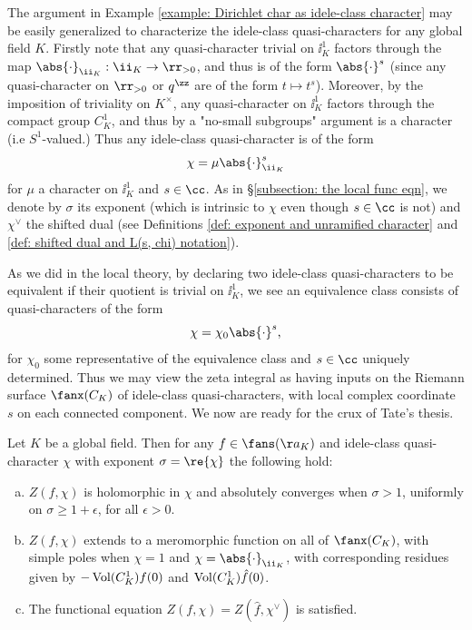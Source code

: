 \documentclass[11pt, x11names, openany]{book}
\begin{document}
The argument in Example \ref{example: Dirichlet char as idele-class character} may be easily generalized to characterize the idele-class quasi-characters for any global field $K$. Firstly note that any quasi-character trivial on $\ii^1_K$ factors through the map $\abs{\cdot}_{\ii_K}: \ii_K \to \rr_{> 0}$, and thus is of the form $\abs{\cdot}^s$ (since any quasi-character on $\rr_{> 0}$ or $q^\zz$ are of the form $t \mapsto t^s$). Moreover, by the imposition of triviality on $K^\times$, any quasi-character on $\ii^1_K$ factors through the compact group $C^1_K$, and thus by a "no-small subgroups" argument is a character (i.e $S^1$-valued.) Thus any idele-class quasi-character is of the form
\begin{equation}
    \label{eqn: idele-class quasi-character}
    \chi = \mu \abs{\cdot}_{\ii_K}^s
\end{equation}
for $\mu$ a character on $\ii^1_K$ and $s \in \cc$. As in \S\ref{subsection: the local func eqn}, we denote by $\sigma$ its exponent (which is intrinsic to $\chi$ even though $s \in \cc$ is not) and $\chi^\lor$ the shifted dual (see Definitions \ref{def: exponent and unramified character} and \ref{def: shifted dual and L(s, chi) notation}). 

As we did in the local theory, by declaring two idele-class quasi-characters to be equivalent if their quotient is trivial on $\ii^1_K$, we see an equivalence class consists of quasi-characters of the form 
\begin{equation*}
    \chi = \chi_0 \abs{\cdot}^s,
\end{equation*}
for $\chi_0$ some representative of the equivalence class and $s \in \cc$ uniquely determined. Thus we may view the zeta integral as having inputs on the Riemann surface $\fanx(C_K)$ of idele-class quasi-characters, with local complex coordinate $s$ on each connected component. We now are ready for the crux of Tate's thesis.

\begin{theorem}
\label{thm: global func eqn}
Let $K$ be a global field. Then for any $f \in \fans(\aa_K)$ and idele-class quasi-character $\chi$ with exponent $\sigma = \re{\chi}$  the following hold:
\begin{enumerate}[(a)]
    \item \label{thmitem: global zeta func absolutely converges} $Z(f, \chi)$ is holomorphic in $\chi$ and absolutely converges when $\sigma > 1$, uniformly on $\sigma \geq 1 + \epsilon$, for all $\epsilon > 0$.
    \item \label{thmitem: global zeta func meromorphic cont.}$Z(f, \chi)$ extends to a meromorphic function on all of $\fanx(C_K)$, with simple poles when $\chi = 1$ and $\chi = \abs{\cdot}_{\ii_K}$, with corresponding residues given by $- \operatorname{Vol}(C^1_K)f(0)$ and $\operatorname{Vol}(C^1_K)\hat{f}(0)$.
    \item \label{thmitem: global zeta func eqn} The functional equation $Z(f, \chi) = Z(\hat{f}, \chi^\lor)$ is satisfied.
\end{enumerate}
\end{theorem}
\end{document}
